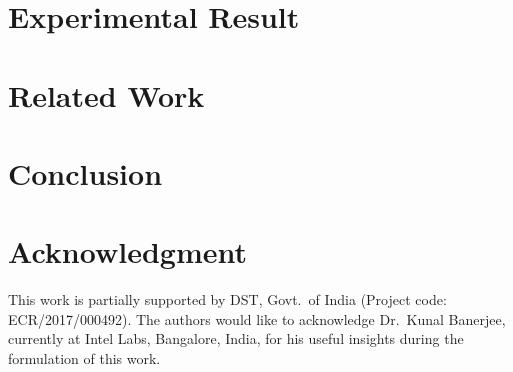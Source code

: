 \documentclass[conference,10pt]{IEEEtran}
\begin{document}
\section{Experimental Result\label{Sec:Exp}}

\section{Related Work\label{Sec:Rework}}

\section{Conclusion\label{Sec:conclusion}}

\section*{Acknowledgment}
This work is
partially supported by DST, Govt.\ of India (Project code: ECR/2017/000492).
The authors would like to acknowledge Dr.\ Kunal Banerjee, currently 
at Intel Labs, Bangalore, India, for his useful insights during the formulation of this work. 

 
\end{document}
